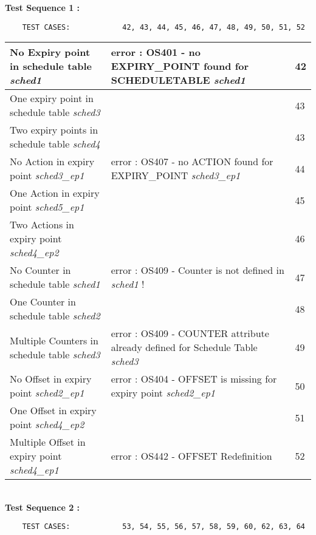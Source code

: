 \documentclass[10pt]{article}
\newlength{\Li}\settowidth{\Li}{Running}
\newlength{\Lii}\setlength{\Lii}{7cm}
\newlength{\Liiii}\setlength{\Liiii}{0.9cm}
\newlength{\Liii}\setlength{\Liii}{\textwidth} \addtolength{\Liii}{-\Li} \addtolength{\Liii}{-\Lii} \addtolength{\Liii}{-\Liiii}
\begin{document}
	\textbf{Test Sequence 1 :}
	\begin{lstlisting}
	TEST CASES:		       42, 43, 44, 45, 46, 47, 48, 49, 50, 51, 52
	\end{lstlisting}
	

	\begin{supertabular}{|p{\Li}|p{\Lii}|p{\Liii}|} \hline 
	No Expiry point in schedule table \textit{sched1}				& error : OS401 - no EXPIRY\_POINT found for SCHEDULETABLE \textit{sched1} 			& 42 \\ \hline	
	One expiry point in schedule table  \textit{sched3}				& 																		& 43 \\ \hline
	Two expiry points in schedule table \textit{sched4}				& 																		& 43 \\ \hline
	No Action in expiry point \textit{sched3\_ep1}					& error : OS407 - no ACTION found for EXPIRY\_POINT \textit{sched3\_ep1} 				& 44 \\ \hline
	One Action in expiry point \textit{sched5\_ep1}					& 																		& 45 \\ \hline
	Two Actions in expiry point \textit{sched4\_ep2}				& 																		& 46 \\ \hline
	No Counter in schedule table \textit{sched1}					& error : OS409 - Counter is not defined in \textit{sched1} ! 							& 47 \\ \hline
	One Counter in schedule table \textit{sched2}					& 																		& 48 \\ \hline
	Multiple Counters in schedule table \textit{sched3}					& error : OS409 - COUNTER attribute already defined for Schedule Table \textit{sched3} & 49 \\ \hline
	No Offset in expiry point \textit{sched2\_ep1}					& error : OS404 - OFFSET is missing for expiry point \textit{sched2\_ep1}					& 50 \\ \hline
	One Offset in expiry point \textit{sched4\_ep2}					& 																		& 51 \\ \hline
	Multiple Offset in expiry point \textit{sched4\_ep1}				& error : OS442 - OFFSET Redefinition											& 52 \\ \hline	
	\end{supertabular}\\
		
	\textbf{Test Sequence 2 :}
	\begin{lstlisting}
	TEST CASES:		       53, 54, 55, 56, 57, 58, 59, 60, 62, 63, 64
	\end{lstlisting}
	
\end{document}
